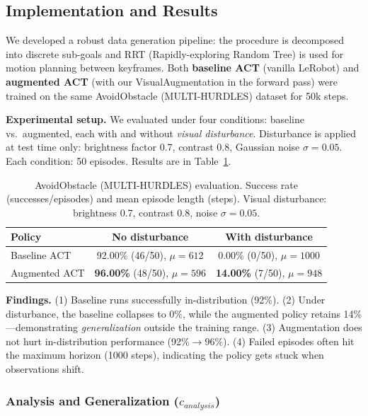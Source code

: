 \documentclass[10pt]{article} %
\begin{document}
\subsection{Implementation and Results}

We developed a robust data generation pipeline: the procedure is decomposed into discrete sub-goals and RRT (Rapidly-exploring Random Tree) is used for motion planning between keyframes. Both \textbf{baseline ACT} (vanilla LeRobot) and \textbf{augmented ACT} (with our VisualAugmentation in the forward pass) were trained on the same AvoidObstacle (MULTI-HURDLES) dataset for 50k steps.

\textbf{Experimental setup.} We evaluated under four conditions: baseline vs.\ augmented, each with and without \emph{visual disturbance}. Disturbance is applied at test time only: brightness factor 0.7, contrast 0.8, Gaussian noise $\sigma=0.05$. Each condition: 50 episodes. Results are in Table~\ref{tab:custom_eval}.

\begin{table}[H]
\centering
\caption{AvoidObstacle (MULTI-HURDLES) evaluation. Success rate (successes/episodes) and mean episode length (steps). Visual disturbance: brightness 0.7, contrast 0.8, noise $\sigma=0.05$.}
\label{tab:custom_eval}
\small
\begin{tabular}{lcc}
\toprule
\textbf{Policy} & \textbf{No disturbance} & \textbf{With disturbance} \\
\midrule
Baseline ACT & 92.00\% (46/50), $\mu=612$ & 0.00\% (0/50), $\mu=1000$ \\
Augmented ACT & \textbf{96.00\%} (48/50), $\mu=596$ & \textbf{14.00\%} (7/50), $\mu=948$ \\
\bottomrule
\end{tabular}
\end{table}

\noindent\textbf{Findings.} (1) Baseline runs successfully in-distribution (92\%). (2) Under disturbance, the baseline collapses to 0\%, while the augmented policy retains 14\%---demonstrating \emph{generalization} outside the training range. (3) Augmentation does not hurt in-distribution performance (92\%$\to$96\%). (4) Failed episodes often hit the maximum horizon (1000 steps), indicating the policy gets stuck when observations shift.

\subsubsection{Analysis and Generalization ($c_{analysis}$)}
\end{document}
